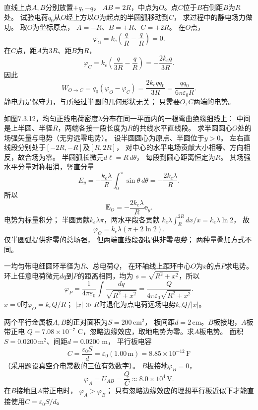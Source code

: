 \problemtext 直线上点$A,B$分别放置$+q,-q$，
$AB=2R$，中点为$O$。点$C$位于$B$右侧距$B$为$R$处。
试验电荷$q_0$从$O$经上方以$O$为起点的半圆弧移动到$C$，
求过程中的静电场力做功。
\workings
取$O$为坐标原点，
$A=-R$、$B=+R$、$C=+2R$。
在$O$点，
\[
\varphi_O=k_e\left(\frac qR-\frac qR\right)=0.
\]
在$C$点，距$A$为$3R$、距$B$为$R$，
\[
\varphi_C=k_e\left(\frac{q}{3R}-\frac qR\right)
=-\frac{2k_eq}{3R}.
\]
因此
\[
\boxed{W_{O\to C}=q_0(\varphi_O-\varphi_C)
=\frac{2k_eqq_0}{3R}
=\frac{qq_0}{6\pi\varepsilon_0R}}.
\]
\crosscheck 静电力是保守力，与所经过半圆的几何形状无关；
只需要$O,C$两端的电势。

\problemtext 如图7.3.12，均匀正线电荷密度$\lambda$分布在同一平面内的一根弯曲绝缘细线上：
中间是上半圆、半径$R$，两端各接一段长度为$R$的共线水平直线段。
求半圆圆心$O$处的场强矢量与电势（无穷远零电势）。
\workings
设半圆圆心为原点、半圆位于$y>0$。
左右直线段分别处于$[-2R,-R]$及$[R,2R]$，
对中心的水平电场贡献大小相等、方向相反，故合场为零。
半圆弧长微元$d\ell=R\,d\theta$，
每段到圆心距离恒定为$R$。
其场强水平分量对称相消，竖直分量
\[
E_y=-\frac{k_e\lambda}{R}
\int_0^\pi\sin\theta\,d\theta
=-\frac{2k_e\lambda}{R}.
\]
所以
\[
\boxed{\bm E_O=-\frac{2k_e\lambda}{R}\bm e_y}.
\]
电势为标量积分；
半圆贡献$k_e\lambda\pi$，两水平段各贡献
$k_e\lambda\int_R^{2R}dx/x=k_e\lambda\ln2$，
故
\[
\boxed{\varphi_O=k_e\lambda(\pi+2\ln2)}.
\]
\crosscheck 仅半圆弧提供非零的总场强，
但两端直线段都提供非零\emph{电势}；
两种量叠加方式不同。

\problemtext 一均匀带电细圆环半径为$R$、总电荷$Q$，
在环轴线上距环中心$O$为$x$的点$P$求电势。
\workings
环上任意电荷微元$dq$到$P$的距离相同，均为
$s=\sqrt{R^2+x^2}$，所以
\[
\varphi_P=\frac1{4\pi\varepsilon_0}
\int\frac{dq}{\sqrt{R^2+x^2}}
=\boxed{\frac{Q}{4\pi\varepsilon_0\sqrt{R^2+x^2}}}.
\]
\crosscheck $x=0$时$\varphi_O=k_eQ/R$；
$|x|\gg R$时退化为点电荷远场电势$k_eQ/|x|$。

\problemtext 两个平行金属板$A,B$的正对面积为$S=200\,\mathrm{cm^2}$，
板间距$d=2\,\mathrm{cm}$。$B$板接地，$A$板带正电
$Q=7.08\times10^{-7}$ C，忽略边缘效应，取地电势为零。求$A$板电势。
\workings
面积$S=0.0200\,\mathrm{m^2}$、间距$d=0.0200$ m，
平行板电容
\[
C=\frac{\varepsilon_0 S}{d}
=\varepsilon_0(1.00\,\mathrm m)
=8.85\times10^{-12}\,\mathrm F
\]
（采用题设真空介电常数的三位有效数字）。
$B$板接地$\varphi_B=0$，
\[
\boxed{\varphi_A=U_{AB}=\frac{Q}{C}
\approx8.0\times10^4\,\mathrm V}.
\]
\crosscheck 在$B$接地且$A$带正电时，
$\varphi_A>\varphi_B$；
只有忽略边缘效应的理想平行板近似下才能直接使用$C=\varepsilon_0S/d$。

